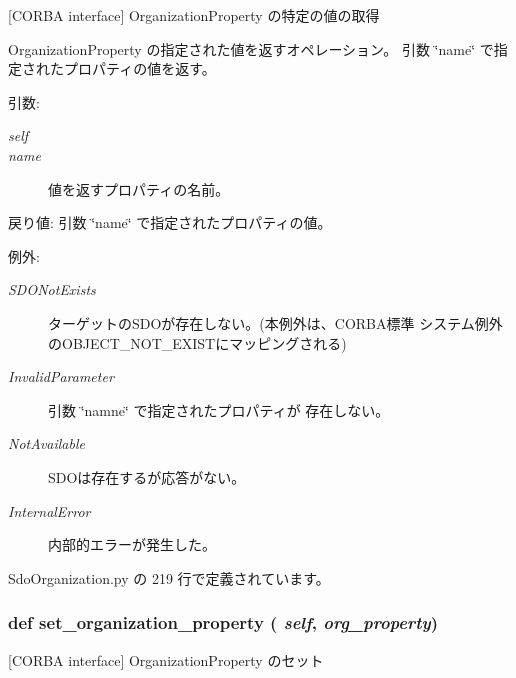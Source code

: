 [CORBA interface] OrganizationProperty の特定の値の取得 

OrganizationProperty の指定された値を返すオペレーション。 引数 \char`\"{}name\char`\"{} で指定されたプロパティの値を返す。

\begin{Desc}
\item[引数:]
\begin{description}
\item[{\em self}]\item[{\em name}]値を返すプロパティの名前。\end{description}
\end{Desc}
\begin{Desc}
\item[戻り値:]引数 \char`\"{}name\char`\"{} で指定されたプロパティの値。\end{Desc}
\begin{Desc}
\item[例外:]
\begin{description}
\item[{\em SDONotExists}]ターゲットのSDOが存在しない。(本例外は、CORBA標準 システム例外のOBJECT\_\-NOT\_\-EXISTにマッピングされる) \item[{\em InvalidParameter}]引数 \char`\"{}namne\char`\"{} で指定されたプロパティが 存在しない。 \item[{\em NotAvailable}]SDOは存在するが応答がない。 \item[{\em InternalError}]内部的エラーが発生した。 \end{description}
\end{Desc}


 SdoOrganization.py の 219 行で定義されています。
\subsubsection{\setlength{\rightskip}{0pt plus 5cm}def set\_\-organization\_\-property ( {\em self},  {\em org\_\-property})}\label{classsource__py_1_1_sdo_organization_1_1_organization__impl_f3bd88b8eaf046770eec7499565b4df0}


[CORBA interface] OrganizationProperty のセット 

